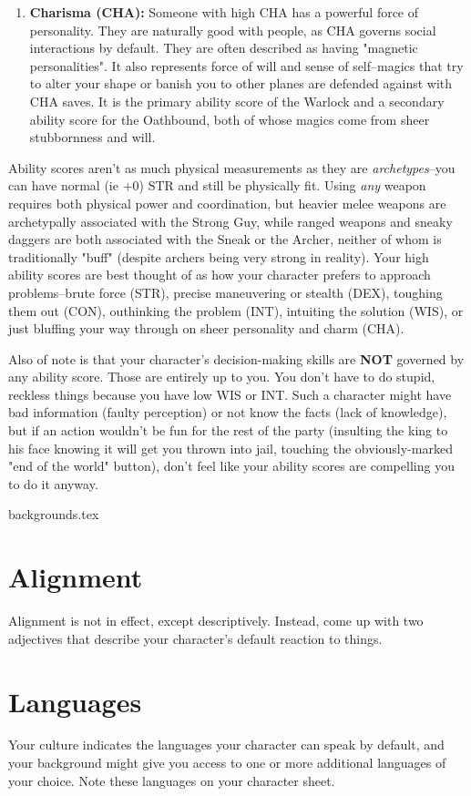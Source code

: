 \begin{enumerate}
	\item \textbf{Charisma (CHA):} Someone with high CHA has a powerful force of personality. They are naturally good with people, as CHA governs social interactions by default. They are often described as having "magnetic personalities". It also represents force of will and sense of self--magics that try to alter your shape or banish you to other planes are defended against with CHA saves. It is the primary ability score of the Warlock and a secondary ability score for the Oathbound, both of whose magics come from sheer stubbornness and will.
\end{enumerate}
	
Ability scores aren't as much physical measurements as they are \textit{archetypes}--you can have normal (ie +0) STR and still be physically fit. Using \textit{any} weapon requires both physical power and coordination, but heavier melee weapons are archetypally associated with the Strong Guy, while ranged weapons and sneaky daggers are both associated with the Sneak or the Archer, neither of whom is traditionally "buff" (despite archers being very strong in reality). Your high ability scores are best thought of as how your character prefers to approach problems--brute force (STR), precise maneuvering or stealth (DEX), toughing them out (CON), outhinking the problem (INT), intuiting the solution (WIS), or just bluffing your way through on sheer personality and charm (CHA).

Also of note is that your character's decision-making skills are \textbf{NOT} governed by any ability score. Those are entirely up to you. You don't have to do stupid, reckless things because you have low WIS or INT. Such a character might have bad information (faulty perception) or not know the facts (lack of knowledge), but if an action wouldn't be fun for the rest of the party (insulting the king to his face knowing it will get you thrown into jail, touching the obviously-marked "end of the world" button), don't feel like your ability scores are compelling you to do it anyway.

{backgrounds.tex}

\section{Alignment}
\label{sec:alignment}
Alignment is not in effect, except descriptively. Instead, come up with two adjectives that describe your character's default reaction to things. 

\section{Languages}
\label{sec:languages}
Your culture indicates the languages your character can speak by default, and your background might give you access to one or more additional languages of your choice. Note these languages on your character sheet.

